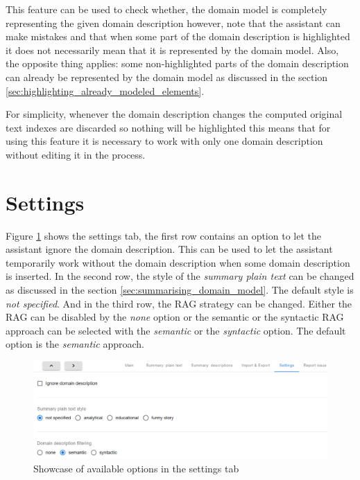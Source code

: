This feature can be used to check whether, the domain model is completely representing the given domain description however, note that the assistant can make mistakes and that when some part of the domain description is highlighted it does not necessarily mean that it is represented by the domain model. Also, the opposite thing applies: some non-highlighted parts of the domain description can already be represented by the domain model as discussed in the section \ref{sec:highlighting_already_modeled_elements}.

For simplicity, whenever the domain description changes the computed original text indexes are discarded so nothing will be highlighted this means that for using this feature it is necessary to work with only one domain description without editing it in the process.


\section{Settings}

Figure \ref{fig:settings_tab} shows the settings tab, the first row contains an option to let the assistant ignore the domain description. This can be used to let the assistant temporarily work without the domain description when some domain description is inserted. In the second row, the style of the \emph{summary plain text} can be changed as discussed in the section \ref{sec:summarising_domain_model}. The default style is \textit{not specified}. And in the third row, the RAG strategy can be changed. Either the RAG can be disabled by the \textit{none} option or the semantic or the syntactic RAG approach can be selected with the \textit{semantic} or the \textit{syntactic} option. The default option is the \textit{semantic} approach.

\begin{figure}[!h]
    \includegraphics[scale=0.46]{../docs/images/frontend/settings.png}
    \caption{\centering Showcase of available options in the settings tab}
    \label{fig:settings_tab}
\end{figure}


